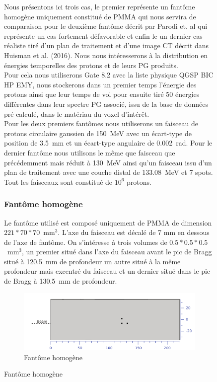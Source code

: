 \documentclass[11pt,a4paper,oldfontcommands]{memoir}
\begin{document}
\begin{figure}
Nous présentons ici trois cas, le premier représente un fantôme homogène uniquement constitué de PMMA qui nous servira de comparaison pour le deuxième fantôme décrit par Parodi et. al \cite{1487723} qui représente un cas fortement défavorable et enfin le un dernier cas réaliste tiré d'un plan de traitement et d'une image CT décrit dans Huisman et al. (2016). Nous nous intéresserons à la distribution en énergies temporelles des protons et de leurs PG produits.\\ Pour cela nous utiliserons Gate 8.2 avec la liste physique QGSP BIC HP EMY, nous stockerons dans un premier temps l'énergie des protons ainsi que leur temps de vol pour ensuite tiré 50 énergies différentes dans leur spectre PG associé, issu de la base de données pré-calculé, dans le matériau du voxel d'intérêt.\\
Pour les deux premiers fantômes nous utiliserons un faisceau de protons circulaire gaussien de 150~MeV avec un écart-type de position de 3.5~mm et un écart-type angulaire de 0.002~rad. Pour le dernier fantôme nous utilisons le même que faisceau que précédemment mais réduit à 130~MeV ainsi qu'un faisceau issu d'un plan de traitement avec une couche distal de 133.08~MeV et 7 spots. Tout les faisceaux sont constitué de $10^6$ protons. 

\subsubsection{Fantôme homogène}

Le fantôme utilisé est composé uniquement de PMMA de dimension $221*70*70$~mm$^3$. L'axe du faisceau est décalé de 7 mm en dessous de l'axe de fantôme. On s'intéresse à trois volumes de $0.5*0.5*0.5$~mm$^3$, un premier situé dans l'axe du faisceau avant le pic de Bragg situé à 120.5~mm de profondeur un autre situé à la même profondeur mais excentré du faisceau et un dernier situé dans le pic de Bragg à 130.5~mm de profondeur.\\
\begin{figure}[h!]
    \centering
    \includegraphics[scale = 0.3]{homo/homofant.png}
    \caption{Fantôme homogène}
    \label{fant homo}
\end{figure}{}




\end{figure}
\end{document}
